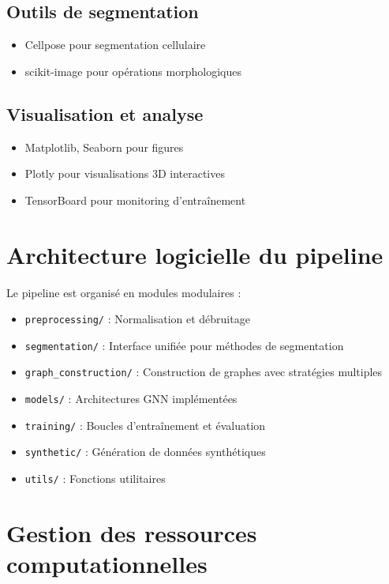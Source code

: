 \subsection{Outils de segmentation}
\begin{itemize}
    \item Cellpose pour segmentation cellulaire
    \item scikit-image pour opérations morphologiques
\end{itemize}

\subsection{Visualisation et analyse}
\begin{itemize}
    \item Matplotlib, Seaborn pour figures
    \item Plotly pour visualisations 3D interactives
    \item TensorBoard pour monitoring d'entraînement
\end{itemize}

\section{Architecture logicielle du pipeline}

Le pipeline est organisé en modules modulaires :
\begin{itemize}
    \item \texttt{preprocessing/} : Normalisation et débruitage
    \item \texttt{segmentation/} : Interface unifiée pour méthodes de segmentation
    \item \texttt{graph\_construction/} : Construction de graphes avec stratégies multiples
    \item \texttt{models/} : Architectures GNN implémentées
    \item \texttt{training/} : Boucles d'entraînement et évaluation
    \item \texttt{synthetic/} : Génération de données synthétiques
    \item \texttt{utils/} : Fonctions utilitaires
\end{itemize}

\section{Gestion des ressources computationnelles}

